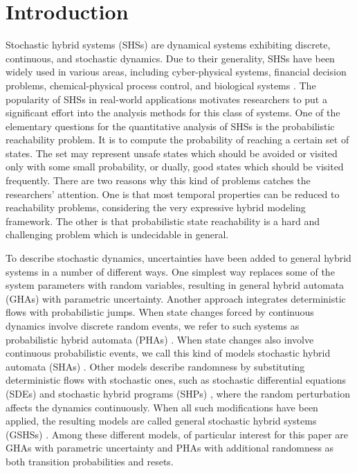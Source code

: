\section{Introduction} 
Stochastic hybrid systems (SHSs) are dynamical systems exhibiting discrete, continuous, and stochastic dynamics. Due to their generality, SHSs have been widely used in various areas, including cyber-physical systems, financial decision problems, chemical-physical process control, and biological systems \cite{blom2006stochastic, clarke2011statistical}. The popularity of SHSs in real-world applications motivates researchers to put a significant effort into the analysis methods for this class of systems. One of the elementary questions for the quantitative analysis of SHSs is the probabilistic reachability problem. It is to compute the probability of reaching a certain set of states. The set may represent unsafe states which should be avoided or visited only with some small probability, or dually, good states which should be visited frequently. There are two reasons why this kind of problems catches the researchers' attention. One is that most temporal properties can be reduced to reachability problems, considering the very expressive hybrid modeling framework. The other is that probabilistic state reachability is a hard and challenging problem which is undecidable in general. 

To describe stochastic dynamics, uncertainties have been added to general hybrid systems in a number of different ways. One simplest way replaces some of the system parameters with random variables, resulting in general hybrid automata (GHAs) with parametric uncertainty. Another approach integrates deterministic flows with probabilistic jumps. When state changes forced by continuous dynamics involve discrete random events, we refer to such systems as probabilistic hybrid automata (PHAs) \cite{sproston2000decidable}. When state changes also involve continuous probabilistic events, we call this kind of models stochastic hybrid automata (SHAs) \cite{franzle2011measurability}. Other models describe randomness by substituting deterministic flows with stochastic ones, such as stochastic differential equations (SDEs) \cite{ludwiga1974sde} and stochastic hybrid programs (SHPs) \cite{platzer2011stochastic}, where the random perturbation affects the dynamics continuously. When all such modifications have been applied, the resulting models are called general stochastic hybrid systems (GSHSs) \cite{hu2000towards}. Among these different models, of particular interest for this paper are GHAs with parametric uncertainty and PHAs with additional randomness as both transition probabilities and resets. 


